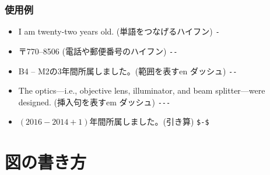 \documentclass[a4j]{jsarticle}
\begin{document}
\subsubsection{使用例}
\begin{itemize}
 \item I am twenty-two years old. (単語をつなげるハイフン) \verb|-|
 \item 〒770--8506 (電話や郵便番号のハイフン)  \verb|--|
 \item B4 -- M2の3年間所属しました。(範囲を表すen ダッシュ) \verb|--|
 \item The optics---i.e., objective lens, illuminator, and beam splitter---were designed. (挿入句を表すem ダッシュ) \verb|---|
 \item $(2016-2014+1)$年間所属しました。(引き算) \verb|$-$|
\end{itemize}
\clearpage
\section{図の書き方}
\end{document}
